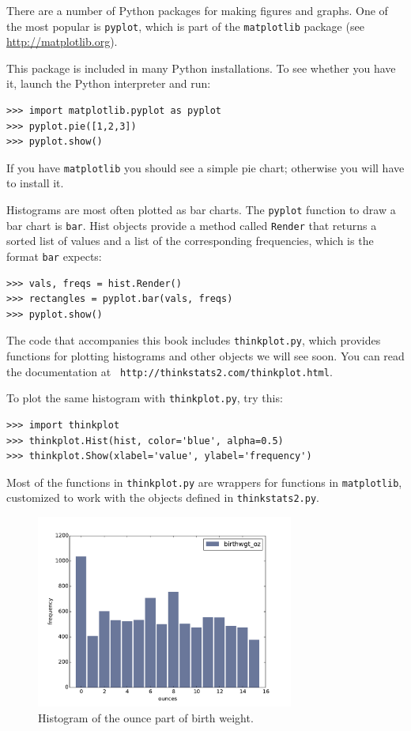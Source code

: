 \documentclass[12pt]{book}
\begin{document}
There are a number of Python packages for making figures and graphs.
One of the most popular is {\tt pyplot}, which is part of
the {\tt matplotlib} package (see \url{http://matplotlib.org}).

This package is included in many Python installations.  To see whether
you have it, launch the Python interpreter and run:
%
\begin{verbatim}
>>> import matplotlib.pyplot as pyplot
>>> pyplot.pie([1,2,3])
>>> pyplot.show()
\end{verbatim}

If you have {\tt matplotlib} you should see a simple pie chart;
otherwise you will have to install it.

Histograms are most often plotted as bar charts.  The
{\tt pyplot} function to draw a bar chart is {\tt bar}.  Hist
objects provide a method called {\tt Render} that returns a sorted
list of values and a list of the corresponding frequencies, which
is the format {\tt bar} expects:
%
\begin{verbatim}
>>> vals, freqs = hist.Render()
>>> rectangles = pyplot.bar(vals, freqs)
>>> pyplot.show()
\end{verbatim}

The code that accompanies this book includes
{\tt thinkplot.py}, which provides functions
for plotting histograms and other objects we will see soon.
You can read the documentation at {\tt
  http://thinkstats2.com/thinkplot.html}. 

To plot the same histogram with {\tt thinkplot.py}, try this:

\begin{verbatim}
>>> import thinkplot
>>> thinkplot.Hist(hist, color='blue', alpha=0.5)
>>> thinkplot.Show(xlabel='value', ylabel='frequency')
\end{verbatim}

Most of the functions in {\tt thinkplot.py} are wrappers for
functions in {\tt matplotlib}, customized to work with
the objects defined in {\tt thinkstats2.py}.

\begin{figure}
\centerline{\includegraphics[height=2.5in]{figs/first_wgt_oz_hist.pdf}}
\caption{Histogram of the ounce part of birth weight.}
\label{first_wgt_oz_hist}
\end{figure}
\end{document}
